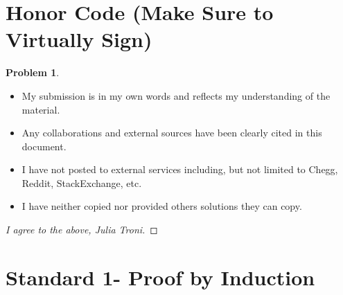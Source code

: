 \documentclass[11pt]{article}
\theoremstyle{definition}
\theoremstyle{definition}
\newtheorem{required}{Problem}
\theoremstyle{definition}
\begin{document}
\section{Honor Code (Make Sure to Virtually Sign)} \label{HonorCode}

\begin{required}
\begin{itemize}
\item My submission is in my own words and reflects my understanding of the material.
\item Any collaborations and external sources have been clearly cited in this document.
\item I have not posted to external services including, but not limited to Chegg, Reddit, StackExchange, etc.
\item I have neither copied nor provided others solutions they can copy.
\end{itemize}

\end{required}

\begin{proof}[I agree to the above, Julia Troni]
\end{proof}


\newpage
\section{Standard 1- Proof by Induction}
\end{document}
